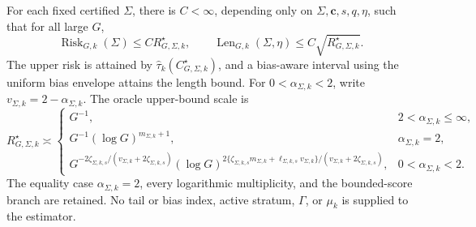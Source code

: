 For each fixed certified \(\Sigma\), there is \(C<\infty\), depending only on \(\Sigma,\mathbf c,s,q,\eta\), such that for all large \(G\), \[\operatorname{Risk}_{G,k}(\Sigma)\le C R_{G,\Sigma,k}^{\star},\qquad\operatorname{Len}_{G,k}(\Sigma,\eta)\le C\sqrt{R_{G,\Sigma,k}^{\star}}.\] The upper risk is attained by \(\widehat\tau_k(C_{G,\Sigma,k}^{\star})\), and a bias-aware interval using the uniform bias envelope attains the length bound. For \(0<\alpha_{\Sigma,k}<2\), write \(v_{\Sigma,k}=2-\alpha_{\Sigma,k}\). The oracle upper-bound scale is \[R_{G,\Sigma,k}^{\star}\asymp\begin{cases}G^{-1},&2<\alpha_{\Sigma,k}\le\infty,\\G^{-1}(\log G)^{m_{\Sigma,k}+1},&\alpha_{\Sigma,k}=2,\\G^{-2\zeta_{\Sigma,k,s}/(v_{\Sigma,k}+2\zeta_{\Sigma,k,s})}(\log G)^{2\{\zeta_{\Sigma,k,s}m_{\Sigma,k}+\ell_{\Sigma,k,s}v_{\Sigma,k}\}/(v_{\Sigma,k}+2\zeta_{\Sigma,k,s})},&0<\alpha_{\Sigma,k}<2.\end{cases}\] The equality case \(\alpha_{\Sigma,k}=2\), every logarithmic multiplicity, and the bounded-score branch are retained. No tail or bias index, active stratum, \(\Gamma\), or \(\mu_k\) is supplied to the estimator.